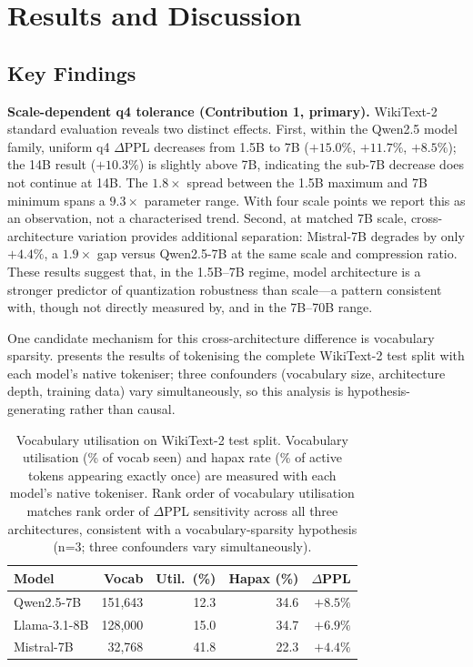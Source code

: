 \documentclass[10pt,twocolumn]{article}
\begin{document}
\section{Results and Discussion}
\label{sec:results}

\subsection{Key Findings}
\label{sec:results:findings}

\textbf{Scale-dependent q4 tolerance (Contribution 1, primary).}  WikiText-2 standard
evaluation reveals two distinct effects.  First, within the Qwen2.5 model
family, uniform q4 $\Delta$PPL decreases from 1.5B to 7B ($+15.0\%$, $+11.7\%$,
$+8.5\%$); the 14B result ($+10.3\%$) is slightly above 7B, indicating the
sub-7B decrease does not continue at 14B.  The $1.8\times$ spread between the
1.5B maximum and 7B minimum spans a $9.3\times$ parameter range.  With four scale
points we report this as an observation, not a characterised trend.  Second, at matched 7B scale,
cross-architecture variation provides additional separation:
Mistral-7B degrades by only $+4.4\%$, a $1.9\times$ gap versus
Qwen2.5-7B at the same scale and compression ratio.  These results suggest that,
in the 1.5B--7B regime, model architecture is a stronger predictor of
quantization robustness than scale---a pattern consistent with, though not
directly measured by, \citet{xu2024scaling} and \citet{ouyang2024lowbit} in the
7B--70B range.

One candidate mechanism for this cross-architecture difference is vocabulary
sparsity.   presents the results of tokenising the complete
WikiText-2 test split with each model's native tokeniser; three confounders
(vocabulary size, architecture depth, training data) vary simultaneously,
so this analysis is hypothesis-generating rather than causal.

\begin{table}[t]
  \centering
  \caption{Vocabulary utilisation on WikiText-2 test split.  Vocabulary
    utilisation (\% of vocab seen) and hapax rate (\% of active tokens
    appearing exactly once) are measured with each model's native tokeniser.
    Rank order of vocabulary utilisation matches rank order of $\Delta$PPL
    sensitivity across all three architectures, consistent with a
    vocabulary-sparsity hypothesis (n=3; three confounders vary simultaneously).}
  \label{tab:vocab}
  \begin{tabular}{lrrrr}
    \toprule
    Model & Vocab & Util.\ (\%) & Hapax (\%) & $\Delta$PPL \\
    \midrule
    Qwen2.5-7B   & 151,643 & 12.3 & 34.6 & $+8.5\%$ \\
    Llama-3.1-8B & 128,000 & 15.0 & 34.7 & $+6.9\%$ \\
    Mistral-7B   &  32,768 & 41.8 & 22.3 & $+4.4\%$ \\
    \bottomrule
  \end{tabular}
\end{table}
\end{document}
